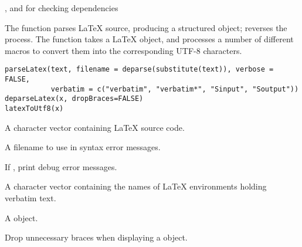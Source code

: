 %
\begin{SeeAlso}\relax
{}, and  for checking
dependencies
\end{SeeAlso}
%
\begin{Examples}
\end{Examples}
%
\begin{Description}\relax
The  function parses LaTeX source, producing a
structured object;  reverses the process.  The
 function takes a LaTeX object, and processes a number
of different macros to convert them into the corresponding UTF-8
characters.
\end{Description}
%
\begin{Usage}
\begin{verbatim}
parseLatex(text, filename = deparse(substitute(text)), verbose = FALSE,
           verbatim = c("verbatim", "verbatim*", "Sinput", "Soutput"))
deparseLatex(x, dropBraces=FALSE)
latexToUtf8(x)
\end{verbatim}
\end{Usage}
%
\begin{Arguments}
\begin{ldescription}
\item[\code{text}] 
A character vector containing LaTeX source code.

\item[\code{filename}] 
A filename to use in syntax error messages.

\item[\code{verbose}] 
If , print debug error messages.

\item[\code{verbatim}] 
A character vector containing the names of LaTeX environments holding verbatim text.

\item[\code{x}] 
A  object.

\item[\code{dropBraces}] 
Drop unnecessary braces when displaying a  object.

\end{ldescription}
\end{Arguments}
